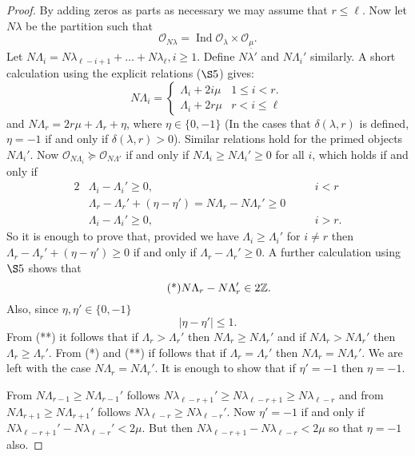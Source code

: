 \documentclass{amsart}
\newcommand\Ind	{\operatorname{Ind}}
\newcommand\Lam	{\Lambda}
\newcommand\Lami	{\Lam_i}
\newcommand\lam	{\lambda}
\newcommand\NLam	{N\Lambda_r}
\newcommand\cO		{{\mathcal O}}
\newcommand\Z		{{\Bbb Z}}
\begin{document}
\begin{proof}
By adding zeros as parts as necessary we may assume that $r \le
\ell$.  Now
let $N\lam$ be the partition such that
     $$
     \cO_{N\lam} = \Ind \cO_\lam \times \cO_{\underline{\mu}}.
     $$
Let $N\Lami = N\lam_{\ell-i+1} +\dots+ N\lam_\ell, i \ge 1$.
Define 
$N\lam'$ and $N\Lami'$ similarly.
A short calculation using the explicit relations ($\S 5$) gives:
     $$
N\Lami = \begin{cases} \Lami + 2i\mu &1 \le i<r. \\ \Lami + 2r\mu &r < i
\le \ell
\end{cases}
     $$
and $\NLam = 2r\mu + \Lam_r + \eta$, where $\eta \in \{0,-1\}$
(In the cases
that $\delta(\lambda,r)$ is defined, $\eta = -1$ if and only if 
$\delta(\lambda,r) > 0$).
Similar relations hold for the primed objects $N\Lami'$.
Now $\cO_{N\Lami} \succeq \cO_{N\Lam'}$ if and only if 
$N\Lami \ge N\Lami' \ge 0$ for all $i$, which holds if and only
if
     \begin{alignat*} {2}
     &\Lami - \Lami' \ge 0, &\quad &i<r      \\
     &\Lam_r - \Lam_r' + (\eta - \eta') = \NLam - N\Lambda_r' \ge
0 && \\
     &\Lami - \Lami' \ge 0, &\quad &i>r. 
     \end{alignat*}
So it is enough to prove that, provided we have $\Lami \ge
\Lami'$ for
$i \ne r$ then $\Lam_r - \Lam_r' + (\eta-\eta') \ge 0$ if and
only if
$\Lam_r - \Lam_r' \ge 0$.  A further calculation using $\S 5$
shows that
     \begin{equation}\tag{*}
     \NLam - \NLam' \in 2\Z.
\end{equation}
Also, since $\eta, \eta' \in \{0,-1\}$
     \begin{equation}\tag{**}
     |\eta-\eta'| \le 1.
\end{equation}
From (**) it follows that if $\Lam_r > \Lam_r'$ then $\NLam \ge
\NLam'$ and
if $\NLam > \NLam'$ then $\Lam_r \ge \Lam_r'$.  From (*) and (**)
if follows
that if $\Lam_r = \Lam_r'$ then $\NLam = \NLam'$.  We are left
with the
case $\NLam = \NLam'$.  It is enough to show that if $\eta' = -1$
then
$\eta = -1$.  

From $N\Lam_{r-1} \ge N\Lam_{r-1}'$ follows
$N\lam_{\ell-r+1}' \ge N\lam_{\ell-r+1} \ge N\lam_{\ell-r}$
and from $N\Lam_{r+1} \ge N\Lam_{r+1}'$ follows
$N\lam_{\ell-r} \ge N\lam_{\ell-r}'$.  Now $\eta' = -1$
if and only if $N\lam_{\ell-r+1}' - N\lam_{\ell-r}' < 2\mu$.  But
then 
$N\lam_{\ell-r+1} - N\lam_{\ell-r} < 2\mu$ so that $\eta = -1$
also.
\end{proof}
\end{document}
